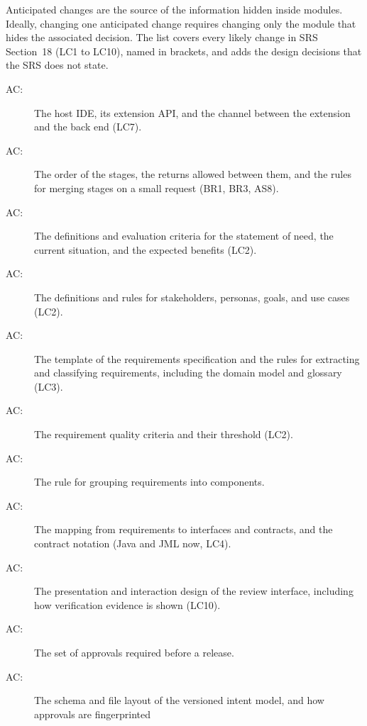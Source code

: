 \documentclass[12pt, titlepage]{article}
\newcounter{acnum}
\newcommand{\actheacnum}{AC\theacnum}
\begin{document}
Anticipated changes are the source of the information hidden inside modules.
Ideally, changing one anticipated change requires changing only the module that
hides the associated decision. The list covers every likely change in SRS
Section~18 (LC1 to LC10), named in brackets, and adds the design decisions that
the SRS does not state.

\begin{description}
\item[ \actheacnum \label{acHostIDE}:] The host IDE, its
  extension API, and the channel between the extension and the back end
  (LC7).
\item[ \actheacnum \label{acStages}:] The order of the
  stages, the returns allowed between them, and the rules for merging stages
  on a small request (BR1, BR3, AS8).
\item[ \actheacnum \label{acNeed}:] The definitions and
  evaluation criteria for the statement of need, the current situation, and
  the expected benefits (LC2).
\item[ \actheacnum \label{acUsersGoals}:] The definitions
  and rules for stakeholders, personas, goals, and use cases (LC2).
\item[ \actheacnum \label{acTemplate}:] The template of
  the requirements specification and the rules for extracting and classifying
  requirements, including the domain model and glossary (LC3).
\item[ \actheacnum \label{acQuality}:] The requirement
  quality criteria and their threshold (LC2).
\item[ \actheacnum \label{acArch}:] The rule for grouping
  requirements into components.
\item[ \actheacnum \label{acContracts}:] The mapping from
  requirements to interfaces and contracts, and the contract notation (Java
  and JML now, LC4).
\item[ \actheacnum \label{acReviewUX}:] The presentation
  and interaction design of the review interface, including how verification
  evidence is shown (LC10).
\item[ \actheacnum \label{acRelease}:] The set of
  approvals required before a release.
\item[ \actheacnum \label{acSchema}:] The schema and file
  layout of the versioned intent model, and how approvals are fingerprinted

\end{description}
\end{document}
